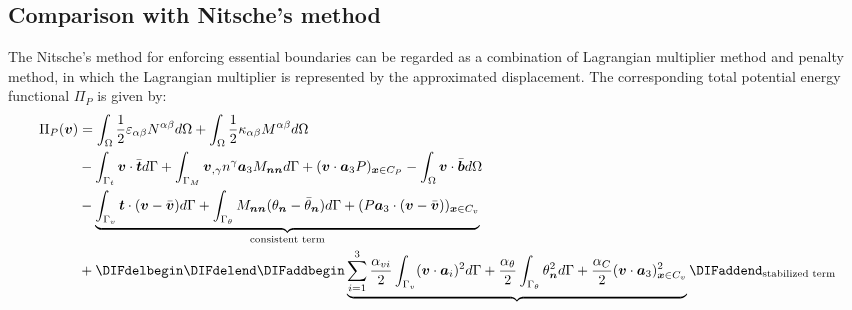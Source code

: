 \DIFdelend \DIFaddbegin {}\DIFaddend \subsection{Comparison with Nitsche's method}
The Nitsche's method for enforcing essential boundaries can be regarded as a combination of Lagrangian multiplier method and penalty method, in which the Lagrangian multiplier is represented by the approximated displacement. The corresponding total potential energy functional $\Pi_P$ is given by:
\begin{equation}
\begin{split}
\Pi_P(\boldsymbol v) &= \int_\Omega \frac{1}{2}\varepsilon_{\alpha\beta} N^{\alpha\beta} d\Omega +
\int_\Omega \frac{1}{2} \kappa_{\alpha\beta}M^{\alpha\beta} d\Omega \\
                     &- \int_{\Gamma_t} \boldsymbol v \cdot \bar{\boldsymbol t} d\Gamma 
                     + \int_{\Gamma_M} \boldsymbol v_{,\gamma} n^\gamma \boldsymbol a_3 M_{\boldsymbol{nn}} d\Gamma
                     + (\boldsymbol v \cdot \boldsymbol a_3 P)_{\boldsymbol x \in C_P}
                     - \int_\Omega \boldsymbol v \cdot \bar{\boldsymbol b} d\Omega \\
                     &- \underbrace{\int_{\Gamma_v} \boldsymbol t \cdot (\boldsymbol v - \bar{\boldsymbol v}) d\Gamma
                     + \int_{\Gamma_\theta} M_{\boldsymbol{nn}}(\theta_{\boldsymbol n} - \bar \theta_{\boldsymbol n})d\Gamma
                     + (P\boldsymbol a_3 \cdot (\boldsymbol v - \bar{\boldsymbol v}))_{\boldsymbol x \in C_v}}_{\text{consistent term}} \\
                     &+ \DIFdelbegin %
\DIFdelend \DIFaddbegin \underbrace{\sum_{i=1}^3\frac{\alpha_{vi}}{2} \int_{\Gamma_v} (\boldsymbol v \cdot \boldsymbol a_i)^2 d\Gamma 
                     + \frac{\alpha_\theta}{2} \int_{\Gamma_\theta} \theta_{\boldsymbol n}^2 d\Gamma
             + \frac{\alpha_C}{2}(\boldsymbol v \cdot \boldsymbol a_3)^2_{\boldsymbol x\in C_v}}\DIFaddend _{\text{stabilized term}}
\end{split}
\end{equation}
